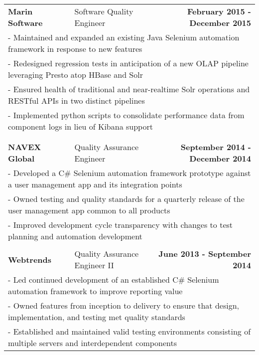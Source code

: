 \documentclass[letterpaper]{article}
\begin{document}
\begin{center}
\begin{tabular}{p{}p{}r}
			\\ %
				\textbf{Marin Software}									&
				Software Quality Engineer										&
				\textbf{February 2015 - December 2015 \quad}
			\\
				\multicolumn{3}{p{\textwidth}}{\quad\quad - Maintained and expanded an existing Java Selenium automation framework in response to new features} 
			\\
				\multicolumn{3}{p{\textwidth}}{\quad\quad - Redesigned regression tests in anticipation of a new OLAP pipeline leveraging Presto atop HBase and Solr} 
			\\
				\multicolumn{3}{p{\textwidth}}{\quad\quad - Ensured health of traditional and near-realtime Solr operations and RESTful APIs in two distinct pipelines } 
			\\
				\multicolumn{3}{p{\textwidth}}{\quad\quad - Implemented python scripts to consolidate performance data from component logs in lieu of Kibana support } 
			\\
			\\
			\\ %
				\textbf{NAVEX Global}									&
				Quality Assurance Engineer										&
				\textbf{September 2014 - December 2014 \quad}
			\\
				\multicolumn{3}{p{\textwidth}}{\quad\quad - Developed a C\# Selenium automation framework prototype against a user management app and its integration points} 
			\\
				\multicolumn{3}{p{\textwidth}}{\quad\quad - Owned testing and quality standards for a quarterly release of the user management app common to all products} 
			\\
				\multicolumn{3}{p{\textwidth}}{\quad\quad - Improved development cycle transparency with changes to test planning and automation development} 
			\\
			\\ %
				\textbf{Webtrends}					&
				Quality Assurance Engineer II							&
				\textbf{June 2013 - September 2014 \quad}
			\\
				\multicolumn{3}{p{\textwidth}}{\quad\quad - Led continued development of an established C\# Selenium automation framework to improve reporting value}
			\\
				\multicolumn{3}{p{\textwidth}}{\quad\quad - Owned features from inception to delivery to ensure that design, implementation, and testing met quality standards} 
			\\
				\multicolumn{3}{p{\textwidth}}{\quad\quad - Established and maintained valid testing environments consisting of multiple servers and interdependent components} 

\end{tabular}
\end{center}
\end{document}
